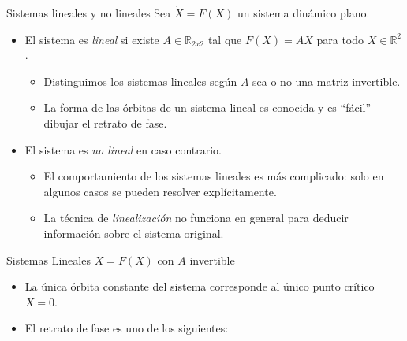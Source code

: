 \documentclass{beamer}
\newcommand{\R}{{\ensuremath{\mathbb{R}}}}
\begin{document}
\begin{frame}{Sistemas lineales y no lineales}
Sea $\dot{X} = F(X)$ un sistema dinámico plano.
\pause
\begin{itemize}
\item El sistema es \emph{lineal} si existe $A \in \R_{2x2}$ tal que $F(X) = AX$ para todo $X \in \R^2$. \pause
	\begin{itemize}
		\item Distinguimos los sistemas lineales según $A$ sea o no una matriz invertible.
		\pause
		\item La forma de las órbitas de un sistema lineal es conocida y es ``fácil'' dibujar el retrato de fase.
		\pause
	\end{itemize}
\item El sistema es \emph{no lineal} en caso contrario.
	\pause
	\begin{itemize}
		\item El comportamiento de los sistemas lineales es más complicado: solo en algunos casos se pueden resolver explícitamente.
		\pause
		\item La técnica de \emph{linealización} no funciona en general para deducir información sobre el sistema original.
	\end{itemize}
\end{itemize}

\end{frame}

\begin{frame}{Sistemas Lineales $\dot{X} = F(X)$ con $A$ invertible}
\begin{itemize}
 \item La única órbita constante del sistema corresponde al único punto crítico $X = 0$.
 \item El retrato de fase es uno de los siguientes:
\end{itemize}

\end{frame}
\end{document}

